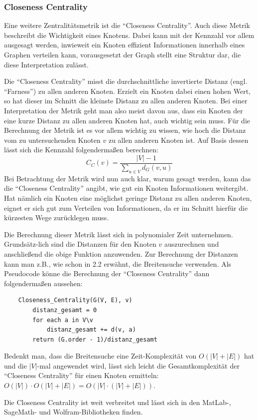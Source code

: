 \documentclass[a4paper,12pt,ngerman,chapterprefix=false,listof=totoc,bibliography=totoc]{scrreprt}
\begin{document}
\subsubsection*{Closeness Centrality}
{
Eine weitere Zentralitätsmetrik ist die "`Closeness Centrality"'. Auch diese Metrik beschreibt die Wichtigkeit eines Knotens. Dabei kann mit der Kennzahl vor allem ausgesagt werden, inwieweit ein Knoten effizient Informationen innerhalb eines Graphen verteilen kann, vorausgesetzt der Graph stellt eine Struktur dar, die diese Interpretation zulässt. \cite{neo4j_closeness_2020}

Die "`Closeness Centrality"' misst die durchschnittliche invertierte Distanz (engl. "`Farness"') zu allen anderen Knoten. Erzielt ein Knoten dabei einen hohen Wert, so hat dieser im Schnitt die kleinste Distanz zu allen anderen Knoten. Bei einer Interpretation der Metrik geht man also meist davon aus, dass ein Knoten der eine kurze Distanz zu allen anderen Knoten hat, auch wichtig sein muss. Für die Berechnung der Metrik ist es vor allem wichtig zu wissen, wie hoch die Distanz vom zu untersuchenden Knoten \(v\) zu allen anderen Knoten ist. Auf Basis dessen lässt sich die Kennzahl folgendermaßen berechnen: \cite{cohen_computing_2014}
\[
	C_C(v)=\frac{|V|-1}{\sum_{u\in V}d_G(v,u)}	
\]
Bei Betrachtung der Metrik wird nun auch klar, warum gesagt werden, kann das die "`Closeness Centrality"' angibt, wie gut ein Knoten Informationen weitergibt. Hat nämlich ein Knoten eine möglichst geringe Distanz zu allen anderen Knoten, eignet er sich gut zum Verteilen von Informationen, da er im Schnitt hierfür die kürzesten Wege zurücklegen muss.

Die Berechnung dieser Metrik lässt sich in polynomialer Zeit unternehmen. Grundsätz-lich sind die Distanzen für den Knoten \(v\) auszurechnen und anschließend die obige Funktion anzuwenden. Zur Berechnung der Distanzen kann man z.B., wie schon in 2.2 erwähnt, die Breitensuche verwenden. Als Pseudocode könne die Berechnung der "`Closeness Centrality"' dann folgendermaßen aussehen:
\begin{lstlisting}
	Closeness_Centrality(G(V, E), v)
		distanz_gesamt = 0
		for each a in V\v
			distanz_gesamt += d(v, a)
		return (G.order - 1)/distanz_gesamt
\end{lstlisting}
Bedenkt man, dass die Breitensuche eine Zeit-Komplexität von \(O(|V|+|E|)\) hat und die \(|V|\)-mal angewendet wird, lässt sich leicht die Gesamtkomplexität der "`Closeness Centrality"' für einen Knoten ermitteln: \(O(|V|)\cdot O(|V|+|E|)=O(|V|\cdot(|V|+|E|))\). \cite{sariyuce_incremental_2013}

Die Closeness Centrality ist weit verbreitet und lässt sich in den MatLab-, SageMath- und Wolfram-Bibliotheken finden. \cite{matlab_measure_2020,sagemath_generic_nodate,wolfram_graph_2020}
}
\end{document}
